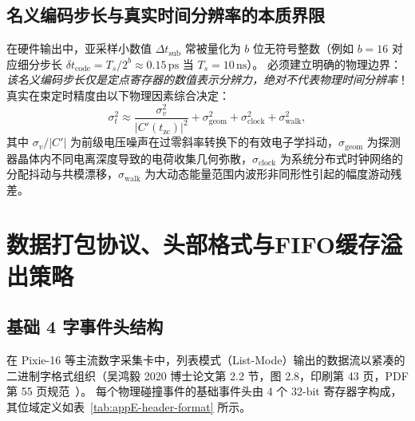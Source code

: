 \subsection{名义编码步长与真实时间分辨率的本质界限}

在硬件输出中，亚采样小数值 $\Delta t_{\mathrm{sub}}$ 常被量化为 $b$ 位无符号整数（例如 $b = 16$ 对应细分步长 $\delta t_{\mathrm{code}} = T_s / 2^b \approx 0.15\,\text{ps}$ 当 $T_s = 10\,\text{ns}$）。
必须建立明确的物理边界：\emph{该名义编码步长仅是定点寄存器的数值表示分辨力，绝对不代表物理时间分辨率}！
真实在束定时精度由以下物理因素综合决定：
\begin{equation}\label{eq:appE-timing-jitter}
\sigma_t^2 \approx \frac{\sigma_v^2}{|C'(t_{\mathrm{zc}})|^2} + \sigma_{\mathrm{geom}}^2 + \sigma_{\mathrm{clock}}^2 + \sigma_{\mathrm{walk}}^2,
\end{equation}
其中 $\sigma_v / |C'|$ 为前级电压噪声在过零斜率转换下的有效电子学抖动，$\sigma_{\mathrm{geom}}$ 为探测器晶体内不同电离深度导致的电荷收集几何弥散，$\sigma_{\mathrm{clock}}$ 为系统分布式时钟网络的分配抖动与共模漂移，$\sigma_{\mathrm{walk}}$ 为大动态能量范围内波形非同形性引起的幅度游动残差。

\section{数据打包协议、头部格式与FIFO缓存溢出策略}\label{sec:appE-packet-format}

\subsection{基础 4 字事件头结构}

在 Pixie-16 等主流数字采集卡中，列表模式（List-Mode）输出的数据流以紧凑的二进制字格式组织（吴鸿毅 2020 博士论文第 2.2 节，图 2.8，印刷第 43 页，PDF 第 55 页规范~\cite{wu-hongyi-2020-general-purpose-digital-daq-thesis}）。
每个物理碰撞事件的基础事件头由 4 个 32-bit 寄存器字构成，其位域定义如表~\ref{tab:appE-header-format} 所示。

